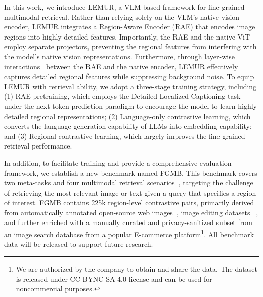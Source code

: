 In this work, we introduce LEMUR, a VLM-based framework for fine-grained multimodal retrieval. Rather than relying solely on the VLM’s native vision encoder, LEMUR integrates a Region-Aware Encoder (RAE) that encodes image regions into highly detailed features. Importantly, the RAE and the native ViT employ separate projectors, preventing the regional features from interfering with the model’s native vision representations.
Furthermore, through layer-wise interactions~\citep{he2018layer-wise} between the RAE and the native encoder, LEMUR effectively captures detailed regional features while suppressing background noise.
To equip LEMUR with retrieval ability, we adopt a three-stage training strategy, including (1) RAE pretraining, which employs the Detailed Localized Captioning task~\citep{lian2025dam} under the next-token prediction paradigm to encourage the model to learn highly detailed regional representations; (2) Language-only contrastive learning, which converts the language generation capability of LLMs into embedding capability; and (3) Regional contrastive learning, which largely improves the fine-grained retrieval performance.

In addition, to facilitate training and provide a comprehensive evaluation framework, we establish a new benchmark named FGMB. This benchmark covers two meta-tasks and four multimodal retrieval scenarios~\citep{zhang2024gme}, targeting the challenge of retrieving the most relevant image or text given a query that specifies a region of interest. FGMB contains 225k region-level contrastive pairs, primarily derived from automatically annotated open-source web images~\citep{kakaobrain2022coyo-700m,kirillov2023segany}, image editing datasets ~\citep{vismin2024,jiao2024imgdiffcontrastivedatasynthesis}, and further enriched with a manually curated and privacy-sanitized subset from an image search database from a popular E-commerce platform\footnote{We are authorized by the company to obtain and share the data. The dataset is released under CC BYNC-SA 4.0 license and can be used for noncommercial purposes.}. All benchmark data will be released to support future research.

